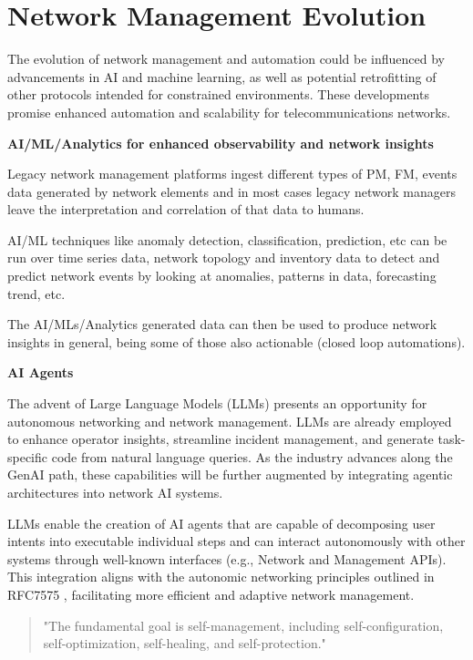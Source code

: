 \documentclass[10pt,sigconf]{iabart}
\begin{document}
\section{Network Management Evolution} \label{insights}

The evolution of network management and automation could be influenced by advancements in AI and machine learning, as well as potential retrofitting of other protocols intended for constrained environments. These developments promise enhanced automation and scalability for telecommunications networks.


\textbf{AI/ML/Analytics for enhanced observability and network insights}

Legacy network management platforms ingest different types of PM, FM, events data generated by network elements and in most cases legacy network managers leave the interpretation and correlation of that data to humans. 

AI/ML techniques like anomaly detection, classification, prediction, etc can be run over time series data, network topology and inventory data to detect and predict network events by looking at anomalies, patterns in data, forecasting trend, etc. 

The AI/MLs/Analytics generated data can then be used to produce network insights in general, being some of those also actionable (closed loop automations).


\textbf{AI Agents}

The advent of Large Language Models (LLMs) presents an opportunity for autonomous networking and network management. LLMs are already employed to enhance operator insights, streamline incident management, and generate task-specific code from natural language queries. As the industry advances along the GenAI path, these capabilities will be further augmented by integrating agentic architectures into network AI systems.

LLMs enable the creation of AI agents that are capable of decomposing user intents into executable individual steps and can interact autonomously with other systems through well-known interfaces (e.g., Network and Management APIs). This integration aligns with the autonomic networking principles outlined in RFC7575 \cite{RFC7575}, facilitating more efficient and adaptive network management.

\begin{quote}
"The fundamental goal is self-management, including self-configuration, self-optimization, self-healing, and self-protection." 
\end{quote}
\end{document}
